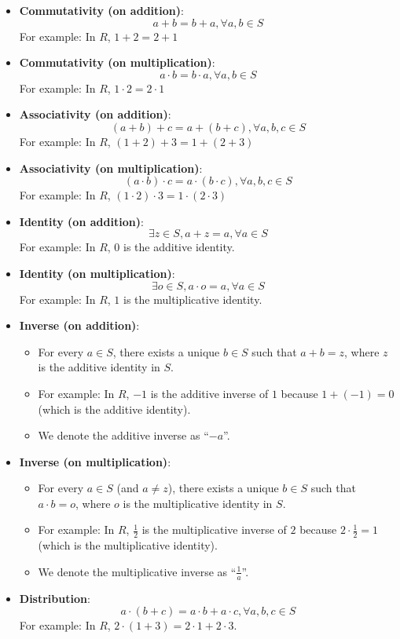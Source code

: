 \documentclass[12pt, letterpaper, oneside]{book}
\begin{document}
\begin{itemize}
  \item \textbf{Commutativity (on addition)}:
    \[ a + b = b + a, \forall a, b \in S \]
    For example: In $R$, $1 + 2 = 2 + 1$
  \item \textbf{Commutativity (on multiplication)}:
    \[ a \cdot b = b \cdot a, \forall a, b \in S \]
    For example: In $R$, $1 \cdot 2 = 2 \cdot 1$
  \item \textbf{Associativity (on addition)}:
    \[ (a + b) + c = a + (b + c), \forall a, b, c \in S \]
    For example: In $R$, $(1 + 2) + 3 = 1 + (2 + 3)$
  \item \textbf{Associativity (on multiplication)}:
    \[ (a \cdot b) \cdot c = a \cdot (b \cdot c), \forall a, b, c \in S \]
    For example: In $R$, $(1 \cdot 2) \cdot 3 = 1 \cdot (2 \cdot 3)$
  \item \textbf{Identity (on addition)}:
    \[ \exists z \in S, a + z = a, \forall a \in S \]
    For example: In $R$, $0$ is the additive identity.
  \item \textbf{Identity (on multiplication)}:
    \[ \exists o \in S, a \cdot o = a, \forall a \in S \]
    For example: In $R$, $1$ is the multiplicative identity.
  \item \textbf{Inverse (on addition)}:
    \begin{itemize}
      \item For every $a \in S$, there exists a unique $b \in S$ such that
        $a + b = z$, where $z$ is the additive identity in $S$.
      \item For example: In $R$, $-1$ is the additive inverse of $1$ because
        $1 + (-1) = 0$ (which is the additive identity).
      \item We denote the additive inverse as ``$-a$''.
    \end{itemize}
  \item \textbf{Inverse (on multiplication)}:
    \begin{itemize}
      \item For every $a \in S$ (and $a \neq z$), there exists a unique $b \in
        S$ such that $a \cdot b = o$, where $o$ is the multiplicative identity
        in $S$.
      \item For example: In $R$, $\frac{1}{2}$ is the multiplicative inverse of
        $2$ because $2 \cdot \frac{1}{2} = 1$ (which is the multiplicative
        identity).
      \item We denote the multiplicative inverse as ``$\frac{1}{a}$''.
    \end{itemize}
  \item \textbf{Distribution}:
    \[ a \cdot (b + c) = a \cdot b + a \cdot c, \forall a, b, c \in S \]
    For example: In $R$, $2 \cdot (1 + 3) = 2 \cdot 1 + 2 \cdot 3$.
\end{itemize}
\end{document}
